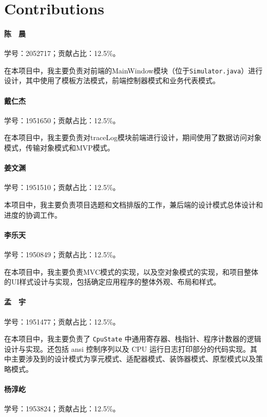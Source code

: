 \newpage
\section*{Contributions}

\paragraph*{陈　晨} 学号：2052717；贡献占比：12.5\%。

在本项目中，我主要负责对前端的MainWindow模块（位于\lstinline{Simulator.java}）进行设计，其中使用了模板方法模式，前端控制器模式和业务代表模式。

\paragraph*{戴仁杰} 学号：1951650；贡献占比：12.5\%。

在本项目中，我主要负责对traceLog模块前端进行设计，期间使用了数据访问对象模式，传输对象模式和MVP模式。

\paragraph*{姜文渊} 学号：1951510；贡献占比：12.5\%。

本项目中，我主要负责项目选题和文档排版的工作，兼后端的设计模式总体设计和进度的协调工作。

\paragraph*{李乐天} 学号：1950849；贡献占比：12.5\%。

在本项目中，我主要负责MVC模式的实现，以及空对象模式的实现，和项目整体的UI样式设计与实现，包括确定应用程序的整体外观、布局和样式。

\paragraph*{孟　宇} 学号：1951477；贡献占比：12.5\%。

​在本项目中，我主要负责了 \lstinline{CpuState} 中通用寄存器、栈指针、程序计数器的逻辑设计与实现。还包括 ansi 控制序列以及 CPU 运行日志打印部分的代码实现。其中主要涉及到的设计模式为享元模式、适配器模式、装饰器模式、原型模式以及策略模式。

\paragraph*{杨淳屹} 学号：1953824；贡献占比：12.5\%。

